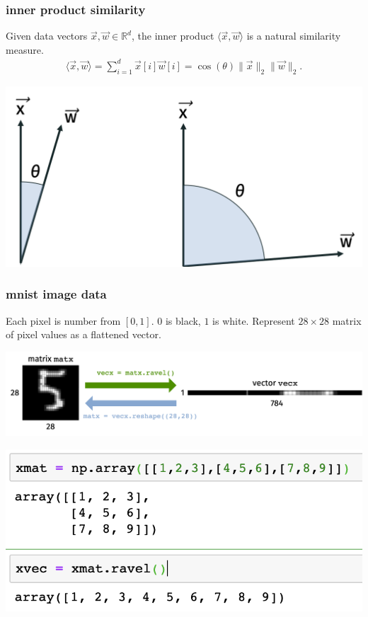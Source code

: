 \documentclass[handout,compress]{beamer}
\newcommand{\R}{\mathbb{R}}
\begin{document}
\begin{frame}
	\frametitle{inner product similarity}
	Given data vectors $\vec{x},\vec{w}\in \R^d$, the inner product $\langle\vec{x}, \vec{w}\rangle$ is a natural similarity measure.
	\begin{align*}
	\langle\vec{x}, \vec{w}\rangle = \sum_{i=1}^d \vec{x}[i]\vec{w}[i] = \cos(\theta)\|\vec{x}\|_2\|\vec{w}\|_2.
	\end{align*}
		\begin{center}
		\includegraphics[width=.7\textwidth]{inner_product_similarity.png}
	\end{center}
\end{frame}

\begin{frame}
	\frametitle{mnist image data}
	Each pixel is number from $[0,1]$. $0$ is black, $1$ is white. 
	Represent $28\times 28$ matrix of pixel values as a flattened vector.
	\begin{center}
		\includegraphics[width=\textwidth]{flatten.png}
		
		\includegraphics[width=.7\textwidth]{flatten_code.png}
	\end{center}
\end{frame}
\end{document}

